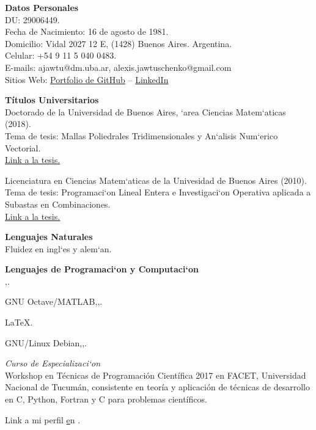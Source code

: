 \textbf{Datos Personales}\\[6pt]
DU: 29006449.\\
Fecha de Nacimiento: 16 de agosto de 1981.\\
Domicilio: Vidal 2027 12 E, (1428) Buenos Aires. Argentina.\\
Celular: +54 9 11 5 040 0483.\\
E-mails: ajawtu@dm.uba.ar, alexis.jawtuschenko@gmail.com\\
Sitios Web: \href{https://github.com/alexisjawtu}{{\color{blue}Portfolio de GitHub}}
-- \href{https://www.linkedin.com/in/alexis-jawtuschenko/}{{\color{blue}LinkedIn}}

\textbf{T\'{i}tulos Universitarios}\\[6pt]
Doctorado de la Universidad de Buenos Aires, `area Ciencias Matem`aticas (2018).\\
Tema de tesis: Mallas Poliedrales Tridimensionales y An`alisis Num`erico Vectorial.\\
\href{https://cms.dm.uba.ar/academico/carreras/doctorado/thesisJawtuschenko.pdf}
{{\color{blue}Link a la tesis.}}

Licenciatura en Ciencias Matem`aticas de la Univesidad de Buenos Aires (2010).\\
Tema de tesis: Programaci`on Lineal Entera e Investigaci`on Operativa aplicada a
Subastas en Combinaciones.\\
\href{https://cms.dm.uba.ar/academico/carreras/licenciatura/tesis/2010/Jawtuschenko_Alexis.pdf}
{{\color{blue}Link a la tesis.}}

\textbf{Lenguajes Naturales}\\[6pt]
Fluidez en ingl`es y alem`an.

\textbf{Lenguajes de Programaci`on y Computaci`on}\\[6pt]
\Cpp,\;.

{GNU Octave/MATLAB},\;,\;.

{LaTeX}.

{GNU/Linux Debian},\;,\;.

\emph{Curso de Especializaci`on}\\
{Workshop en T\'ecnicas de Programaci\'on Cient\'ifica 2017} en FACET, 
Universidad Nacional de Tucum\'an, consistente en teor\'ia y aplicaci\'on de t\'ecnicas 
de desarrollo en C, Python, Fortran y C\masmas\,\,para problemas cient\'ificos.

Link a mi perfil \href{https://projecteuler.net/profile/alexisj.png}
en {\color{blue}{Project Euler}}.

